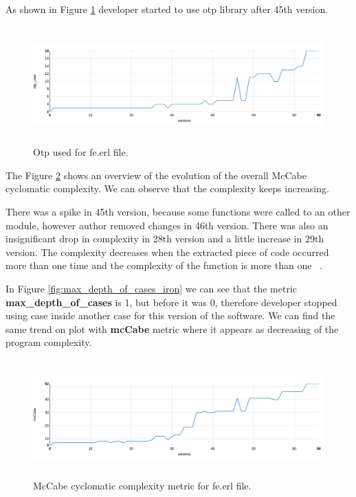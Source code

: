 As shown in Figure \ref{fig:otp_iron} developer started to use otp library after 45th version. 

\begin{figure}[ht]
	\centering
	\includegraphics[height=45mm]{figures/otp_iron.png}
	\caption{Otp used for fe.erl file.}
	\label{fig:otp_iron}
\end{figure}

The Figure \ref{fig:mcCabe_iron} shows an overview of the evolution of the overall McCabe cyclomatic complexity. We can observe that the complexity keeps increasing.

There was a spike in 45th version, because some functions were called to an other module, however author removed changes in 46th version. There was also an insignificant drop in complexity in 28th version and a little increase in 29th version. The  complexity decreases  when  the  extracted  piece  of code occurred more than one time and the complexity of the function is more than one ~\cite{mcCabe}. 

In Figure \ref{fig:max_depth_of_cases_iron} we can see that the metric \textbf{max\_depth\_of\_cases} is 1, but before it was 0, therefore developer stopped using case inside another case for this version of the software. We can find the same trend on plot with \textbf{mcCabe} metric where it appears as decreasing of the program complexity.  

\begin{figure}[ht]
	\centering
	\includegraphics[height=45mm]{figures/mcCabe_iron.png}
	\caption{McCabe cyclomatic complexity metric for fe.erl file.}
	\label{fig:mcCabe_iron}
\end{figure}

